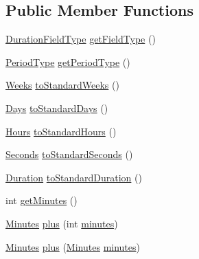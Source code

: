 \subsection*{Public Member Functions}
\begin{DoxyCompactItemize}
\item 
\hyperlink{classorg_1_1joda_1_1time_1_1_duration_field_type}{Duration\-Field\-Type} \hyperlink{classorg_1_1joda_1_1time_1_1_minutes_a6b5840545da62fef11d86396cd6be6cf}{get\-Field\-Type} ()
\item 
\hyperlink{classorg_1_1joda_1_1time_1_1_period_type}{Period\-Type} \hyperlink{classorg_1_1joda_1_1time_1_1_minutes_aac15f69f2e9807f834f83fc060b7d709}{get\-Period\-Type} ()
\item 
\hyperlink{classorg_1_1joda_1_1time_1_1_weeks}{Weeks} \hyperlink{classorg_1_1joda_1_1time_1_1_minutes_a84606256143fbd0716a6751e8e883c5c}{to\-Standard\-Weeks} ()
\item 
\hyperlink{classorg_1_1joda_1_1time_1_1_days}{Days} \hyperlink{classorg_1_1joda_1_1time_1_1_minutes_aea95c19888440d1d5f7d7977f722722c}{to\-Standard\-Days} ()
\item 
\hyperlink{classorg_1_1joda_1_1time_1_1_hours}{Hours} \hyperlink{classorg_1_1joda_1_1time_1_1_minutes_a9c196dfe60d426d279b5de2d30ad2d2b}{to\-Standard\-Hours} ()
\item 
\hyperlink{classorg_1_1joda_1_1time_1_1_seconds}{Seconds} \hyperlink{classorg_1_1joda_1_1time_1_1_minutes_acdd5bc908e369d9e4c52fb228fea690d}{to\-Standard\-Seconds} ()
\item 
\hyperlink{classorg_1_1joda_1_1time_1_1_duration}{Duration} \hyperlink{classorg_1_1joda_1_1time_1_1_minutes_a87ceeeb52afeea910ff823f33f5646c7}{to\-Standard\-Duration} ()
\item 
int \hyperlink{classorg_1_1joda_1_1time_1_1_minutes_aa148401f0cf7a1ba653b04b4f3eefaa8}{get\-Minutes} ()
\item 
\hyperlink{classorg_1_1joda_1_1time_1_1_minutes}{Minutes} \hyperlink{classorg_1_1joda_1_1time_1_1_minutes_ac6b43175cec34a5cbbcb0357816f7df1}{plus} (int \hyperlink{classorg_1_1joda_1_1time_1_1_minutes_ac0a4591486b2223d24ce0519e8643aca}{minutes})
\item 
\hyperlink{classorg_1_1joda_1_1time_1_1_minutes}{Minutes} \hyperlink{classorg_1_1joda_1_1time_1_1_minutes_a1dfa764495744efd048edb2b101c1424}{plus} (\hyperlink{classorg_1_1joda_1_1time_1_1_minutes}{Minutes} \hyperlink{classorg_1_1joda_1_1time_1_1_minutes_ac0a4591486b2223d24ce0519e8643aca}{minutes})
\item 

\end{DoxyCompactItemize}
